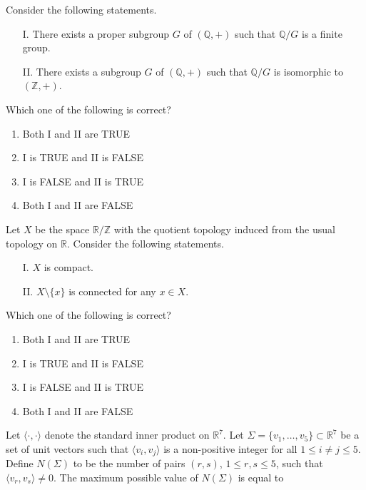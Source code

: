 \iffalse
\chapter{2024}
\section{ma}
\author{EE24BTECH11030}
\fi
    \item Consider the following statements.
\begin{enumerate}
    \item[I.] There exists a proper subgroup $G$ of $(\mathbb{Q}, +)$ such that $\mathbb{Q}/G$ is a finite group.
    \item[II.] There exists a subgroup $G$ of $(\mathbb{Q}, +)$ such that $\mathbb{Q}/G$ is isomorphic to $(\mathbb{Z}, +)$.
\end{enumerate}
Which one of the following is correct?
\begin{enumerate}
    \item Both I and II are TRUE
    \item I is TRUE and II is FALSE
    \item I is FALSE and II is TRUE
    \item Both I and II are FALSE
\end{enumerate}
\bigskip
\item Let $X$ be the space $\mathbb{R}/\mathbb{Z}$ with the quotient topology induced from the usual topology on $\mathbb{R}$. Consider the following statements.
\begin{enumerate}
    \item[I.] $X$ is compact.
    \item[II.] $X \setminus \{x\}$ is connected for any $x \in X$.
\end{enumerate}
Which one of the following is correct?
\begin{enumerate}
    \item Both I and II are TRUE
    \item I is TRUE and II is FALSE
    \item I is FALSE and II is TRUE
    \item Both I and II are FALSE
\end{enumerate}
\bigskip
\item Let $\langle \cdot, \cdot \rangle$ denote the standard inner product on $\mathbb{R}^7$. Let $\Sigma = \{v_1, \ldots, v_5\} \subset \mathbb{R}^7$ be a set of unit vectors such that $\langle v_i, v_j \rangle$ is a non-positive integer for all $1 \leq i \neq j \leq 5$. Define $N(\Sigma)$ to be the number of pairs $(r, s)$, $1 \leq r, s \leq 5$, such that $\langle v_r, v_s \rangle \neq 0$. The maximum possible value of $N(\Sigma)$ is equal to
